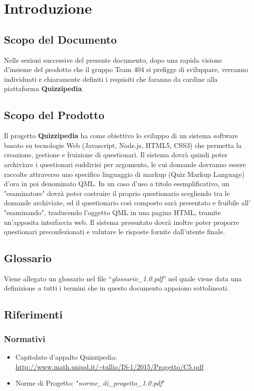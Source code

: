 \documentclass[a4paper,11pt]{article}
\begin{document}
	\section{Introduzione}
	\subsection{Scopo del Documento}
	Nelle sezioni successive del presente documento, dopo una rapida visione d'insieme del prodotto che il gruppo Team 404 si prefigge di sviluppare, verranno individuati e chiaramente definiti i requisiti che faranno da cardine alla piattaforma \textbf{Quizzipedia}.
	\subsection{Scopo del Prodotto}
	Il progetto \textbf{Quizzipedia} ha come obiettivo lo sviluppo di un sistema software basato su tecnologie Web (Javascript, Node.js, HTML5, CSS3) che permetta la creazione, gestione e fruizione di questionari. Il sistema dovrà quindi poter archiviare i questionari suddivisi per argomento, le cui domande dovranno essere raccolte attraverso uno specifico linguaggio di markup (Quiz Markup Language) d'ora in poi denominato QML. In un caso d'uso a titolo esemplificativo, un "esaminatore" dovrà poter costruire il proprio questionario scegliendo tra le domande archiviate, ed il questionario così composto sarà presentato e fruibile all' "esaminando", traducendo l'oggetto QML in una pagina HTML, tramite un'apposita interfaccia web. Il sistema presentato dovrà inoltre poter proporre questionari preconfezionati e valutare le risposte fornite dall'utente finale.
	\subsection{Glossario}
	Viene allegato un glossario nel file ``\textit{glossario\_1.0.pdf}'' nel quale viene data una definizione a tutti i termini che in questo documento appaiono sottolineati.
	\subsection{Riferimenti}
		\subsubsection{Normativi}
		\begin{itemize}
			\item Capitolato d'appalto Quizzipedia:\\
			\url{http://www.math.unipd.it/~tullio/IS-1/2015/Progetto/C5.pdf}
			\item Norme di Progetto: "\textit{norme\_di\_progetto\_1.0.pdf}"
		\end{itemize}
\end{document}
